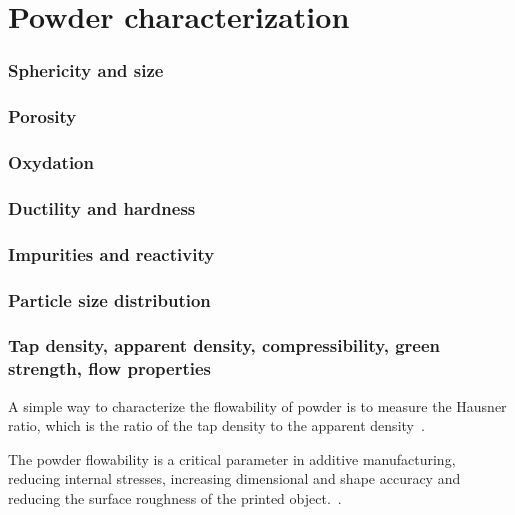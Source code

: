 \documentclass[../main]{subfiles}
\begin{document}
\section{Powder characterization}


\subsubsection{Sphericity and size}
\subsubsection{Porosity}
\subsubsection{Oxydation}
\subsubsection{Ductility and hardness}
\subsubsection{Impurities and reactivity}
\subsubsection{Particle size distribution}
\subsubsection{Tap density, apparent density, compressibility, green strength, flow properties}

A simple way to characterize the flowability of powder is to measure the Hausner ratio, which is the ratio of the tap density to the apparent density~\cite{Jang2020PowderBased}.


The powder flowability is a critical parameter in additive manufacturing, reducing internal stresses, increasing dimensional and shape accuracy and reducing the surface roughness of the printed object.~\cite{Balasz2024InvestigationMetal}.
\end{document}
